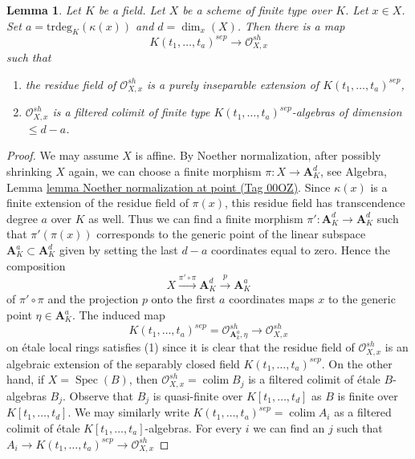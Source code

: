 \documentclass{amsart}
\theoremstyle{plain}
\newtheorem{lemma}[subsection]{Lemma}
\theoremstyle{definition}
\theoremstyle{remark}
\numberwithin{equation}{subsection}
\def\colim{\mathop{\mathrm{colim}}\nolimits}
\def\Spec{\mathop{\mathrm{Spec}}}
\begin{document}
\begin{lemma}
\label{lemma-strictly-henselian}
Let $K$ be a field. Let $X$ be a scheme of finite type over $K$.
Let $x \in X$. Set $a = \text{trdeg}_K(\kappa(x))$
and $d = \dim_x(X)$. Then there is a map
$$
K(t_1, \ldots, t_a)^{sep} \longrightarrow \mathcal{O}_{X, x}^{sh}
$$
such that
\begin{enumerate}
\item the residue field of $\mathcal{O}_{X, x}^{sh}$ is a purely inseparable
extension of $K(t_1, \ldots, t_a)^{sep}$,
\item $\mathcal{O}_{X, x}^{sh}$ is a filtered colimit of finite
type $K(t_1, \ldots, t_a)^{sep}$-algebras of dimension $\leq d - a$.
\end{enumerate}
\end{lemma}

\begin{proof}
We may assume $X$ is affine. By Noether normalization, after possibly
shrinking $X$ again, we can choose a finite morphism
$\pi : X \to \mathbf{A}^d_K$, see
Algebra, Lemma \href{https://stacks.math.columbia.edu/tag/00OZ}{lemma Noether normalization at point (Tag 00OZ)}.
Since $\kappa(x)$ is a finite extension of the residue field of $\pi(x)$,
this residue field has transcendence degree $a$ over $K$ as well.
Thus we can find a finite morphism $\pi' : \mathbf{A}^d_K \to \mathbf{A}^d_K$
such that $\pi'(\pi(x))$ corresponds to the generic point of the linear
subspace $\mathbf{A}^a_K \subset \mathbf{A}^d_K$ given by setting
the last $d - a$ coordinates equal to zero. Hence the composition
$$
X \xrightarrow{\pi' \circ \pi} \mathbf{A}^d_K \xrightarrow{p} \mathbf{A}^a_K
$$
of $\pi' \circ \pi$ and the projection $p$ onto the first $a$ coordinates
maps $x$ to the generic point $\eta \in \mathbf{A}^a_K$. The induced map
$$
K(t_1, \ldots, t_a)^{sep} =
\mathcal{O}_{\mathbf{A}^a_k, \eta}^{sh}
\longrightarrow \mathcal{O}_{X, x}^{sh}
$$
on \'etale local rings satisfies (1) since it is clear that the residue field
of $\mathcal{O}_{X, x}^{sh}$ is an algebraic extension of the separably closed
field $K(t_1, \ldots, t_a)^{sep}$. On the other hand, if $X = \Spec(B)$,
then $\mathcal{O}_{X, x}^{sh} = \colim B_j$ is a filtered colimit
of \'etale $B$-algebras $B_j$. Observe that $B_j$ is quasi-finite over
$K[t_1, \ldots, t_d]$ as $B$ is finite over $K[t_1, \ldots, t_d]$.
We may similarly write
$K(t_1, \ldots, t_a)^{sep} = \colim A_i$ as a filtered colimit
of \'etale $K[t_1, \ldots, t_a]$-algebras. For every $i$ we can
find an $j$ such that
$A_i \to K(t_1, \ldots, t_a)^{sep} \to \mathcal{O}_{X, x}^{sh}$

\end{proof}
\end{document}
